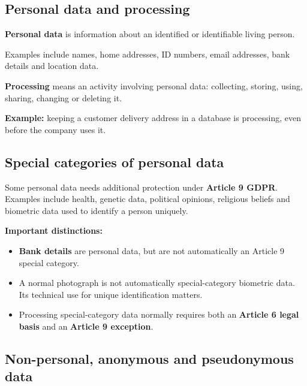\documentclass[12pt,a4paper]{report}
\newcommand{\tightlist}{}
\begin{document}
\hypertarget{personal-data-and-processing}{%
\subsection{Personal data and processing}\label{personal-data-and-processing}}

\textbf{Personal data} is information about an identified or identifiable living person.

Examples include names, home addresses, ID numbers, email addresses, bank details and location data.

\textbf{Processing} means an activity involving personal data: collecting, storing, using, sharing, changing or deleting it.

\textbf{Example:} keeping a customer delivery address in a database is processing, even before the company uses it.

\hypertarget{special-categories-of-personal-data}{%
\subsection{Special categories of personal data}\label{special-categories-of-personal-data}}

Some personal data needs additional protection under \textbf{Article 9 GDPR}. Examples include health, genetic data, political opinions, religious beliefs and biometric data used to identify a person uniquely.

\textbf{Important distinctions:}

\begin{itemize}
\tightlist
\item
  \textbf{Bank details} are personal data, but are not automatically an Article 9 special category.
\item
  A normal photograph is not automatically special-category biometric data. Its technical use for unique identification matters.
\item
  Processing special-category data normally requires both an \textbf{Article 6 legal basis} and an \textbf{Article 9 exception}.
\end{itemize}

\hypertarget{non-personal-anonymous-and-pseudonymous-data}{%
\subsection{Non-personal, anonymous and pseudonymous data}\label{non-personal-anonymous-and-pseudonymous-data}}
\end{document}

